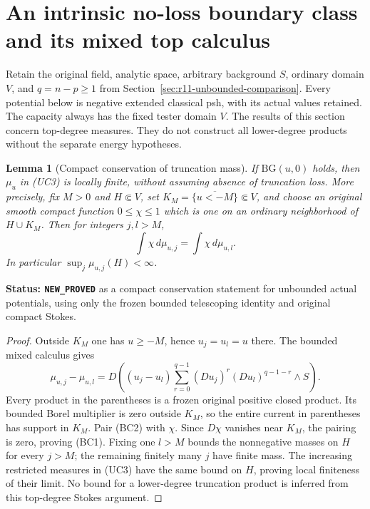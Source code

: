 \documentclass[11pt,a4paper]{article}
\numberwithin{equation}{section}
\newtheorem{lemma}[theorem]{Lemma}
\theoremstyle{definition}
\theoremstyle{remark}
\begin{document}


\section{An intrinsic no-loss boundary class and its mixed top calculus}
\label{sec:r11-capacity-tail-boundary-class}

Retain the original field, analytic space, arbitrary background $S$,
ordinary domain $V$, and $q=n-p\geq1$ from
Section~\ref{sec:r11-unbounded-comparison}. Every potential below is
negative extended classical psh, with its actual values retained.
The capacity always has the fixed tester domain $V$. The results
of this section concern top-degree measures. They do not construct
all lower-degree products without the separate energy hypotheses.

\begin{lemma}[Compact conservation of truncation mass]
\label{lem:r11-compact-truncation-conservation}
If $\mathrm{BG}(u,0)$ holds, then $\mu_u$ in (UC3) is locally
finite, without assuming absence of truncation loss. More precisely,
fix $M>0$ and $H\Subset V$, set
$K_M=\overline{\{u<-M\}}\Subset V$, and choose an original smooth
compact function $0\leq\chi\leq1$ which is one on an ordinary
neighborhood of $H\cup K_M$. Then for integers $j,l>M$,
\[
                       \int\chi\,d\mu_{u,j}
                           =\int\chi\,d\mu_{u,l}.
 \tag{BC1}
\]
In particular $\sup_j\mu_{u,j}(H)<\infty$.
\end{lemma}

\noindent\textbf{Status: \texttt{NEW\_PROVED}} as a compact
conservation statement for unbounded actual potentials, using only
the frozen bounded telescoping identity and original compact Stokes.

\begin{proof}
Outside $K_M$ one has $u\geq-M$, hence $u_j=u_l=u$ there.
The bounded mixed calculus gives
\[
 \mu_{u,j}-\mu_{u,l}
   =D\left((u_j-u_l)
       \sum_{r=0}^{q-1}(Du_j)^r(Du_l)^{q-1-r}\wedge S\right).
 \tag{BC2}
\]
Every product in the parentheses is a frozen original positive
closed product. Its bounded Borel multiplier is zero outside
$K_M$, so the entire current in parentheses has support in $K_M$.
Pair (BC2) with $\chi$. Since $D\chi$ vanishes near $K_M$,
the pairing is zero, proving (BC1). Fixing one $l>M$ bounds
the nonnegative masses on $H$ for every $j>M$; the remaining
finitely many $j$ have finite mass. The increasing restricted
measures in (UC3) have the same bound on $H$, proving local
finiteness of their limit. No bound for a lower-degree truncation
product is inferred from this top-degree Stokes argument.
\end{proof}
\end{document}
